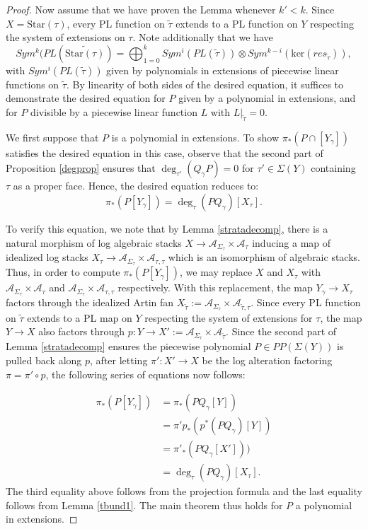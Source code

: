 \documentclass[12pt, oneside]{amsart}   	%
\numberwithin{equation}{section}
\numberwithin{thm}{section}
\numberwithin{figure}{section}
\begin{document}
\begin{proof}
Now assume that we have proven the Lemma whenever $k'<k$. Since $X = \text{Star}(\tau)$, every PL function on $\tilde{\tau}$ extends to a PL function on $Y$ respecting the system of extensions on $\tau$. Note additionally that we have $$Sym^k(PL(\widetilde{\text{Star}(\tau)}) = \bigoplus_{1=0}^k Sym^i(PL(\tilde{\tau}))\otimes Sym^{k-i}(\text{ker}(res_{\tilde{\tau}})),$$ with $Sym^i(PL(\tilde{\tau}))$ given by polynomials in extensions of piecewise linear functions on $\tilde{\tau}$. By linearity of both sides of the desired equation, it suffices to demonstrate the desired equation for $P$ given by a polynomial in extensions, and for $P$ divisible by a piecewise linear function $L$ with $L|_{\tilde{\tau}} = 0$. 

We first suppose that $P$ is a polynomial in extensions. To show $\pi_*(P\cap [Y_{\gamma}])$ satisfies the desired equation in this case, observe that the second part of Proposition \ref{degprop} ensures that $\deg_{\tau'}(Q_{\gamma}P) = 0$ for $\tau' \in \Sigma(Y)$ containing $\tau$ as a proper face. Hence, the desired equation reduces to:
\[\pi_*(P [Y_{\gamma}]) = \deg_{\tau}(PQ_{\gamma})[X_{\tau}].\]

To verify this equation, we note that by Lemma \ref{stratadecomp}, there is a natural morphism of log algebraic stacks $X \rightarrow \mathcal{A}_{\Sigma_{\tau}} \times \mathcal{A}_{\tau}$ inducing a map of idealized log stacks $X_{\tau} \rightarrow \mathcal{A}_{\Sigma_{\tau}} \times \mathcal{A}_{\tau,\tau}$ which is an isomorphism of algebraic stacks. Thus, in order to compute $\pi_*(P [Y_{\gamma}])$, we may replace $X$ and $X_{\tau}$ with $\mathcal{A}_{\Sigma_{\tau}}\times \mathcal{A}_{\tau}$ and $\mathcal{A}_{\Sigma_{\tau}}\times \mathcal{A}_{\tau,\tau}$ respectively.  With this replacement, the map $Y_{\gamma} \rightarrow X_{\tau}$ factors through the idealized Artin fan $X_{\tilde{\tau}}:=\mathcal{A}_{\Sigma_{\tau}}\times \mathcal{A}_{\widetilde{\tau},\tau}$. Since every PL function on $\tilde{\tau}$ extends to a PL map on $Y$ respecting the system of extensions for $\tau$, the map $Y \rightarrow X$ also factors through $p: Y \rightarrow X' := \mathcal{A}_{\Sigma_{\tau}} \times \mathcal{A}_{\widetilde{\tau}}$. Since the second part of Lemma \ref{stratadecomp} ensures the piecewise polynomial $P \in PP(\Sigma(Y))$ is pulled back along $p$, after letting $\pi': X' \rightarrow X$ be the log alteration factoring $\pi = \pi'\circ p$, the following series of equations now follows:


\begin{equation}
\begin{split}
\pi_*(P[Y_{\gamma}]) &= \pi_*(PQ_{\gamma}[Y])\\
 &= \pi' p_*(p^{*}(PQ_{\gamma})[Y])\\
&= \pi'_*(PQ_{\gamma}[X']))\\
&= \deg_{\tau}(PQ_{\gamma}) [X_{\tau}].
\end{split}
\end{equation}
The third equality above follows from the projection formula and the last equality follows from Lemma \ref{tbund1}. The main theorem thus holds for $P$ a polynomial in extensions.


\end{proof}
\end{document}
